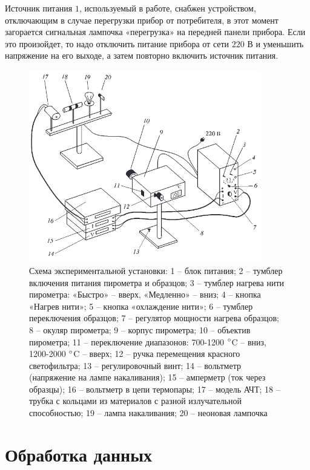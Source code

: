\documentclass[a4paper,12pt]{article}
\begin{document}
Источник питания $1$, используемый в работе, снабжен устройством, отключающим в случае перегрузки прибор от потребителя, в этот момент загорается сигнальная лампочка «перегрузка» на передней панели прибора. Если это произойдет, то надо отключить питание прибора от сети $220$ В и уменьшить напряжение на его выходе, а затем повторно включить источник питания.
\begin{figure}[H]\label{fig: Exp setup}
    \centering
    \includegraphics[width = 0.9\textwidth]{Exp setup.png}
    \caption{Схема экспериментальной установки: 1 -- блок питания; 2 -- тумблер включения питания пирометра и образцов; 3 -- тумблер нагрева нити пирометра: «Быстро» -- вверх, «Медленно» -- вниз; 4 -- кнопка «Нагрев нити»; 5 -- кнопка «охлаждение нити»; 6 -- тумблер переключения образцов; 7 -- регулятор мощности нагрева образцов; 8 -- окуляр пирометра; 9 -- корпус пирометра; 10 -- объектив пирометра; 11 -- переключение диапазонов: 700-1200 $\degree$C -- вниз, 1200-2000 $\degree$C -- вверх; 12 -- ручка перемещения красного светофильтра; 13 -- регулировочный винт; 14 -- вольтметр (напряжение на лампе накаливания); 15 -- амперметр (ток через образцы); 16 -- вольтметр в цепи термопары; 17 -- модель АЧТ; 18 -- трубка с кольцами из материалов с разной излучательной способностью; 19 -- лампа накаливания; 20 -- неоновая лампочка}
\end{figure}

\section{Обработка данных}
\end{document}
